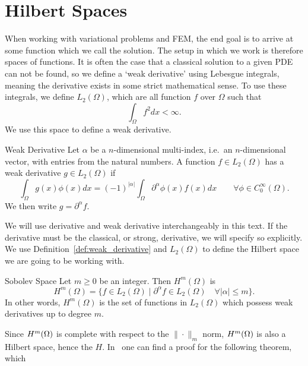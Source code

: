 \section{Hilbert Spaces}
When working with variational problems and FEM,
 the end goal is to arrive at some function which we call the solution.
The setup in which we work is therefore spaces of functions. 
It is often the case that a classical solution to a given PDE can 
not be found, 
so we define a `weak derivative' using Lebesgue integrals, meaning 
the derivative exists in some strict mathematical sense. 
To use these integrals, we define $L_2(\Omega)$, which are all 
function $f$ over $\Omega$ such that 
\begin{equation*}
   \int_\Omega f^2 dx < \infty. 
\end{equation*}
We use this space to define a weak derivative.
\begin{defn}{Weak Derivative}
   Let $\alpha$ be a $n$-dimensional multi-index, i.e.\ an $n$-dimensional vector, 
   with entries from the natural numbers.
    A function $f \in L_2(\Omega)$ has a weak derivative $g \in L_2(\Omega)$
    if
    \begin{equation*}
        \int_\Omega g(x)\phi(x) dx = {(-1)}^{|\alpha|}\int_\Omega 
        \partial ^{\alpha}\phi(x) f(x) dx
        \quad\quad \forall \phi \in C^\infty_0(\Omega).
    \end{equation*}
    We then write $g=\partial ^{\alpha}f$.\label{def:weak_derivative}
\end{defn}
We will use derivative and weak derivative interchangeably in this 
text.
If the derivative must be the classical, or strong, derivative, we will 
specify so explicitly. 
We use Definition~\ref*{def:weak_derivative} and $L_2(\Omega)$ to 
define the Hilbert space we are going to be working with. 
\begin{defn}{Sobolev Space}
   Let $m \geq 0$ be an integer. Then $H^m(\Omega)$ is 
   \begin{equation*}
    H^m(\Omega) = \{  f \in L_2(\Omega) \mid \partial ^{\alpha}f \in 
    L_2(\Omega) \quad \forall |\alpha| \leq m  \}.
   \end{equation*}
   In other words, $H^m(\Omega)$ is the set of functions in $L_2(\Omega)$ 
   which possess weak derivatives up to degree $m$.
\end{defn}
Since $H^m(\Omega)$ is complete with respect to the $\| \cdot\|_m$ norm, 
$H^m(\Omega)$ is also a Hilbert space, hence the $H$.
In~\cite{Brezis} one can find a proof for the following theorem, which 
